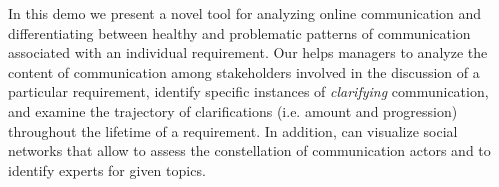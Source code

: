 
In this demo we present a novel tool for analyzing online communication and differentiating between healthy and problematic patterns of communication associated with an individual requirement. 
Our \viss helps managers to analyze the content of communication among stakeholders involved in the discussion of a particular requirement, identify specific instances of \emph{clarifying} communication, and examine the trajectory of clarifications (i.e. amount and progression) throughout the lifetime of a requirement. 
In addition, \viss can visualize social networks that allow to assess the constellation of communication actors and to identify experts for given topics.



